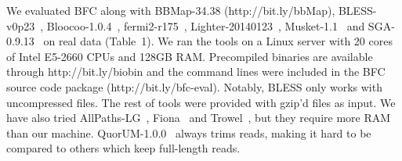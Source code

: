 \documentclass{bioinfo}
\begin{document}
We evaluated BFC along with BBMap-34.38 (\mbox{http://bit.ly/bbMap}),
BLESS-v0p23~\citep{Heo:2014aa}, Bloocoo-1.0.4~\citep{Drezen:2014aa},
fermi2-r175~\citep{Li:2012fk}, Lighter-20140123~\citep{Song:2014aa},
Musket-1.1~\citep{Liu:2013ac} and SGA-0.9.13~\citep{Simpson:2012aa} on real
data (Table~1). We ran the tools on a Linux server with 20 cores of Intel
E5-2660 CPUs and 128GB RAM. Precompiled binaries are available through
http://bit.ly/biobin and the command lines were included in the BFC source code
package (http://bit.ly/bfc-eval).  Notably, BLESS only works with uncompressed
files. The rest of tools were provided with gzip'd files as input. We have also
tried AllPaths-LG~\citep{Gnerre:2011ys}, Fiona~\citep{Schulz:2014aa} and
Trowel~\citep{Lim:2014aa}, but they require more RAM than our machine.
QuorUM-1.0.0~\citep{Zimin:2013aa} always trims reads, making it hard to be
compared to others which keep full-length reads.
\end{document}
